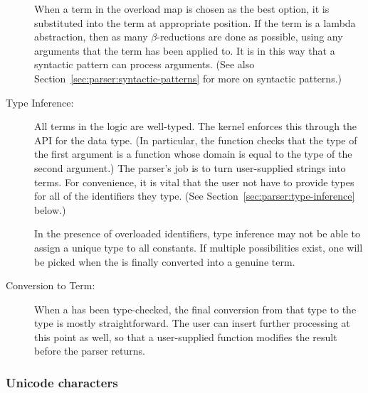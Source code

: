 \begin{description}
  When a term in the overload map is chosen as the best option, it is
  substituted into the term at appropriate position.  If the term is a
  lambda abstraction, then as many $\beta$-reductions are done as
  possible, using any arguments that the term has been applied to.  It
  is in this way that a syntactic pattern can process arguments.  (See
  also Section~\ref{sec:parser:syntactic-patterns} for more on
  syntactic patterns.)
\item[Type Inference:] %
  All terms in the \HOL{} logic are well-typed.  The kernel enforces
  this through the API for the  data type.  (In particular,
  the  function %
  checks that the type of the first argument is a function whose
  domain is equal to the type of the second argument.)  The parser's
  job is to turn user-supplied strings into terms.  For convenience,
  it is vital that the user not have to provide types for all of the
  identifiers they type. (See Section~\ref{sec:parser:type-inference}
  below.)

  In the presence of overloaded identifiers, type inference may not be
  able to assign a unique type to all constants.  If multiple
  possibilities exist, one will be picked when the  is finally
  converted into a genuine term.
\item[Conversion to Term:]%
  When a  has been type-checked, the final conversion from
  that type to the  type is mostly straightforward.  The user
  can insert further processing at this point as well, so that a
  user-supplied function modifies the result before the parser
  returns.
\end{description}

\subsubsection{Unicode characters}
\label{sec:parser:unicode-characters}

